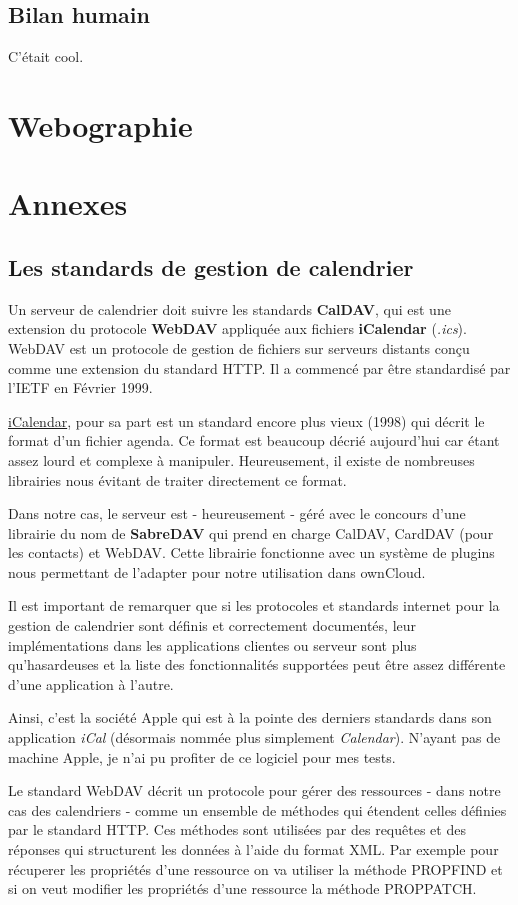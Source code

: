 \documentclass[10pt,a4paper, twoside]{report}
\newcommand{\mychapter}[2]{
	\setcounter{chapter}{#1}
	\setcounter{section}{0}
	\chapter*{#2}
	\addcontentsline{toc}{chapter}{#2}
}
\begin{document}
	\section{Bilan humain}
	C'était cool.
	\mychapter{8}{Webographie}
	\mychapter{9}{Annexes}
	\label{ch:Annexes}
	\section{Les standards de gestion de calendrier}
	\label{sec:standards}
	Un serveur de calendrier doit suivre les standards \textbf{CalDAV}, qui est une extension du protocole \textbf{WebDAV} appliquée aux fichiers \textbf{iCalendar} (\textit{.ics}). WebDAV est un protocole de gestion de fichiers sur serveurs distants conçu comme une extension du standard HTTP. Il a commencé par être standardisé par l'IETF en Février 1999.
	
	\href{https://tools.ietf.org/html/rfc2445}{iCalendar}, pour sa part est un standard encore plus vieux (1998) qui décrit le format d'un fichier agenda. Ce format est beaucoup décrié aujourd'hui car étant assez lourd et complexe à manipuler. Heureusement, il existe de nombreuses librairies nous évitant de traiter directement ce format.
	
	Dans notre cas, le serveur est - heureusement - géré avec le concours d'une librairie du nom de \textbf{SabreDAV} qui prend en charge CalDAV, CardDAV (pour les contacts) et WebDAV. Cette librairie fonctionne avec un système de plugins nous permettant de l'adapter pour notre utilisation dans ownCloud.
	
	Il est important de remarquer que si les protocoles et standards internet pour la gestion de calendrier sont définis et correctement documentés, leur implémentations dans les applications clientes ou serveur sont plus qu'hasardeuses et la liste des fonctionnalités supportées peut être assez différente d'une application à l'autre.
	
	Ainsi, c'est la société Apple qui est à la pointe des derniers standards dans son application \textit{iCal} (désormais nommée plus simplement \textit{Calendar}). N'ayant pas de machine Apple, je n'ai pu profiter de ce logiciel pour mes tests.
	
	Le standard WebDAV décrit un protocole pour gérer des ressources - dans notre cas des calendriers - comme un ensemble de méthodes qui étendent celles définies par le standard HTTP. Ces méthodes sont utilisées par des requêtes et des réponses qui structurent les données à l'aide du format XML. Par exemple pour récuperer les propriétés d'une ressource on va utiliser la méthode PROPFIND et si on veut modifier les propriétés d'une ressource la méthode PROPPATCH.
	
\end{document}
